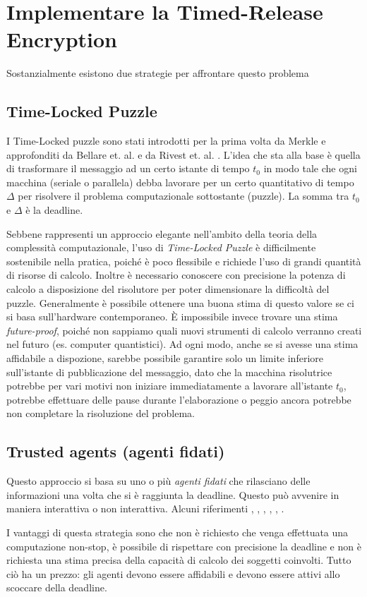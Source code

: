 \section{Implementare la Timed-Release Encryption}
Sostanzialmente esistono due strategie
per affrontare questo problema

\subsection{Time-Locked Puzzle}
I Time-Locked puzzle sono stati introdotti per la prima volta
da Merkle \cite{Merkle:1978:SCO:359460.359473} e approfonditi
da Bellare et. al. \cite{Bellare:1996:EKE:888619}
e da Rivest et. al. \cite{Rivest96time-lockpuzzles}.
L'idea che sta alla base è quella di trasformare il messaggio ad un certo istante di tempo $ t_0 $
in modo tale che ogni macchina
(seriale o parallela) debba lavorare per un certo quantitativo di tempo $ \Delta $ per risolvere
il problema computazionale sottostante (puzzle). La somma tra $ t_0 $ e $ \Delta $ è la deadline.

Sebbene rappresenti un approccio elegante nell'ambito della teoria della complessità computazionale,
l'uso di \textit{Time-Locked Puzzle} è difficilmente sostenibile nella pratica,
poiché è poco flessibile e richiede l'uso di
grandi quantità di risorse di calcolo. Inoltre è necessario conoscere con
precisione la potenza di calcolo a disposizione del risolutore per poter
dimensionare la difficoltà del puzzle. Generalmente è possibile ottenere
una buona stima di questo valore se ci si basa sull'hardware contemporaneo. È impossibile
invece trovare una stima \textit{future-proof}, poiché non sappiamo quali nuovi strumenti di
calcolo verranno creati nel futuro (es. computer quantistici).
Ad ogni modo, anche se si avesse una stima affidabile a dispozione,
sarebbe possibile garantire solo un limite inferiore
sull'istante di pubblicazione del messaggio, dato che la macchina risolutrice potrebbe per vari motivi
non iniziare immediatamente a lavorare all'istante $ t_0 $,
potrebbe effettuare delle pause durante l'elaborazione
o peggio ancora potrebbe non completare la risoluzione del problema.


\subsection{Trusted agents (agenti fidati)}
\label{subsec:trusted-agents}
Questo approccio si basa su uno o più \textit{agenti fidati} che rilasciano
delle informazioni una volta che si è raggiunta la deadline. Questo può avvenire in
maniera interattiva o non interattiva. Alcuni riferimenti
\cite{time-capsule-signature}, \cite{10.1007/11602897_25}, \cite{10.1007/3-540-48910-X_6},
\cite{10.1007/11889663_17}, \cite{10.1007/978-3-642-15317-4_1}, \cite{10.1145/1330332.1330336}.

I vantaggi di questa strategia sono che non è richiesto che venga effettuata una computazione non-stop,
è possibile di rispettare con precisione la deadline e non è richiesta una stima precisa
della capacità di calcolo dei soggetti coinvolti. Tutto ciò ha un prezzo: gli agenti devono
essere affidabili e devono essere attivi allo scoccare della deadline.

